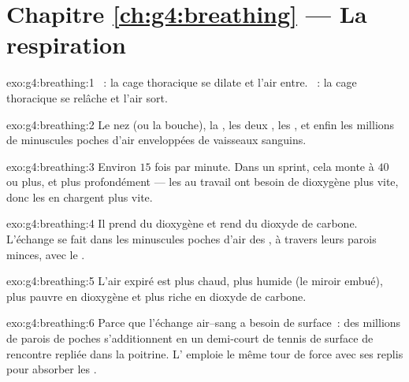 \section*{Chapitre \ref{ch:g4:breathing} --- La respiration}

\begin{solution}{exo:g4:breathing:1}
~: la cage thoracique se dilate et l'air entre.
~: la cage thoracique se relâche et l'air sort.
\end{solution}

\begin{solution}{exo:g4:breathing:2}
Le nez (ou la bouche), la , les deux , les ,
et enfin les millions de minuscules poches d'air enveloppées de
vaisseaux sanguins.
\end{solution}

\begin{solution}{exo:g4:breathing:3}
Environ $15$ fois par minute. Dans un sprint, cela monte à $40$ ou
plus, et plus profondément --- les  au travail ont besoin de
dioxygène plus vite, donc les  en chargent plus vite.
\end{solution}

\begin{solution}{exo:g4:breathing:4}
Il prend du dioxygène et rend du dioxyde de carbone. L'échange se
fait dans les minuscules poches d'air des , à travers leurs
parois minces, avec le .
\end{solution}

\begin{solution}{exo:g4:breathing:5}
L'air expiré est plus chaud, plus humide (le miroir embué), plus
pauvre en dioxygène et plus riche en dioxyde de carbone.
\end{solution}

\begin{solution}{exo:g4:breathing:6}
Parce que l'échange air--sang a besoin de surface~: des millions de
parois de poches s'additionnent en un demi-court de tennis de
surface de rencontre repliée dans la poitrine. L'
emploie le même tour de force avec ses replis pour absorber les
.
\end{solution}

